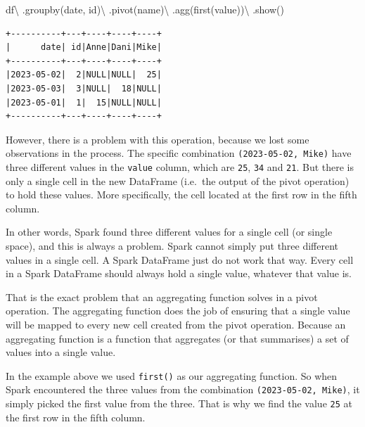 \documentclass[
  11pt,
  letterpaper,
  DIV=11,
  numbers=noendperiod]{scrreprt}
\newenvironment{Shaded}{\begin{snugshade}}{\end{snugshade}}
\newcommand{\NormalTok}[1]{\textcolor[rgb]{0.00,0.23,0.31}{#1}}
\newcommand{\OperatorTok}[1]{\textcolor[rgb]{0.37,0.37,0.37}{#1}}
\newcommand{\StringTok}[1]{\textcolor[rgb]{0.13,0.47,0.30}{#1}}
\begin{document}
\begin{Shaded}
\begin{Highlighting}[]
\NormalTok{df}\OperatorTok{\textbackslash{}}
\NormalTok{    .groupby(}\StringTok{\textquotesingle{}date\textquotesingle{}}\NormalTok{, }\StringTok{\textquotesingle{}id\textquotesingle{}}\NormalTok{)}\OperatorTok{\textbackslash{}}
\NormalTok{    .pivot(}\StringTok{\textquotesingle{}name\textquotesingle{}}\NormalTok{)}\OperatorTok{\textbackslash{}}
\NormalTok{    .agg(first(}\StringTok{\textquotesingle{}value\textquotesingle{}}\NormalTok{))}\OperatorTok{\textbackslash{}}
\NormalTok{    .show()}
\end{Highlighting}
\end{Shaded}

\begin{verbatim}
+----------+---+----+----+----+
|      date| id|Anne|Dani|Mike|
+----------+---+----+----+----+
|2023-05-02|  2|NULL|NULL|  25|
|2023-05-03|  3|NULL|  18|NULL|
|2023-05-01|  1|  15|NULL|NULL|
+----------+---+----+----+----+
\end{verbatim}

However, there is a problem with this operation, because we lost some
observations in the process. The specific combination
\texttt{(\textquotesingle{}2023-05-02\textquotesingle{},\ \textquotesingle{}Mike\textquotesingle{})}
have three different values in the \texttt{value} column, which are
\texttt{25}, \texttt{34} and \texttt{21}. But there is only a single
cell in the new DataFrame (i.e.~the output of the pivot operation) to
hold these values. More specifically, the cell located at the first row
in the fifth column.

In other words, Spark found three different values for a single cell (or
single space), and this is always a problem. Spark cannot simply put
three different values in a single cell. A Spark DataFrame just do not
work that way. Every cell in a Spark DataFrame should always hold a
single value, whatever that value is.

That is the exact problem that an aggregating function solves in a pivot
operation. The aggregating function does the job of ensuring that a
single value will be mapped to every new cell created from the pivot
operation. Because an aggregating function is a function that aggregates
(or that summarises) a set of values into a single value.

In the example above we used \texttt{first()} as our aggregating
function. So when Spark encountered the three values from the
combination
\texttt{(\textquotesingle{}2023-05-02\textquotesingle{},\ \textquotesingle{}Mike\textquotesingle{})},
it simply picked the first value from the three. That is why we find the
value \texttt{25} at the first row in the fifth column.
\end{document}
